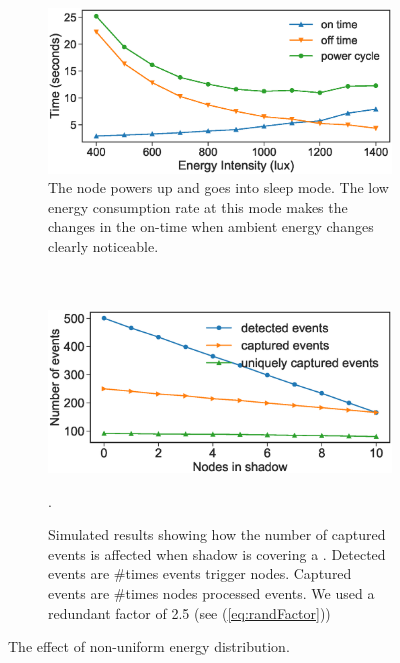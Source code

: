 \begin{figure}
	\begin{subfigure}{0.49\columnwidth}
		\includegraphics[width=\textwidth]{figures/BatterylessNodesDutyCycles_Sleep_mode}
		\caption{The node powers up and goes into sleep mode. The low energy consumption rate at this mode makes the changes in the on-time when ambient energy changes clearly noticeable. \\  \\ \\ }
		\label{fig:differentEnergyIntensity}
	\end{subfigure}\hfill
	\begin{subfigure}{0.49\columnwidth}
		\includegraphics[width=\textwidth]{figures/different_energy_intensity}
		\caption{Simulated results showing how the number of captured events is affected when shadow is covering a \cis. Detected events are \#times events trigger nodes. Captured events are \#times nodes processed events. We used a redundant factor of 2.5 (see (\ref{eq:randFactor}))}.
		\label{fig:sim:differentEnergyIntensity}
	\end{subfigure}
	\vspace{-0.3cm}
	\caption{The effect of non-uniform energy distribution.}
	\label{fig:pwrCycleVSEnergyIntensity}
\end{figure}

